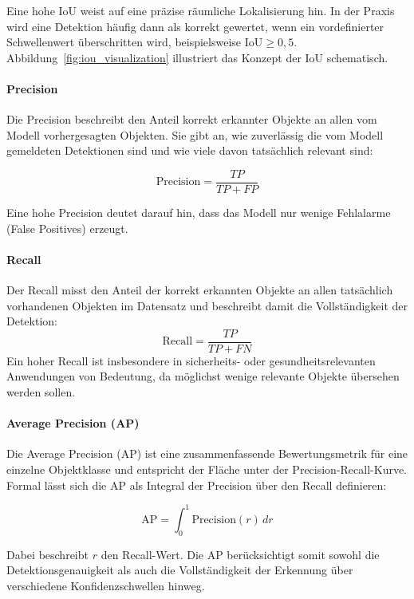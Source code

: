 Eine hohe IoU weist auf eine präzise räumliche Lokalisierung hin. In der Praxis 
wird eine Detektion häufig dann als korrekt gewertet, wenn ein vordefinierter
Schwellenwert überschritten wird, beispielsweise $\text{IoU} \geq 0{,}5$.
Abbildung~\ref{fig:iou_visualization} illustriert das Konzept der IoU
schematisch.

\paragraph{Precision}
Die Precision beschreibt den Anteil korrekt erkannter Objekte an allen vom Modell
vorhergesagten Objekten. Sie gibt an, wie zuverlässig die vom Modell gemeldeten
Detektionen sind und wie viele davon tatsächlich relevant sind:

\begin{equation}
\text{Precision} = \frac{TP}{TP + FP}
\end{equation}

Eine hohe Precision deutet darauf hin, dass das Modell nur wenige Fehlalarme
(False Positives) erzeugt.

\paragraph{Recall}
Der Recall misst den Anteil der korrekt erkannten Objekte an allen tatsächlich
vorhandenen Objekten im Datensatz und beschreibt damit die Vollständigkeit der
Detektion:
\begin{equation}
\text{Recall} = \frac{TP}{TP + FN}
\end{equation}
Ein hoher Recall ist insbesondere in sicherheits- oder gesundheitsrelevanten
Anwendungen von Bedeutung, da möglichst wenige relevante Objekte übersehen werden
sollen.

\paragraph{Average Precision (AP)}
Die Average Precision (AP) ist eine zusammenfassende Bewertungsmetrik für eine
einzelne Objektklasse und entspricht der Fläche unter der Precision-Recall-Kurve.
Formal lässt sich die AP als Integral der Precision über den Recall definieren:

\begin{equation}
\text{AP} = \int_{0}^{1} \text{Precision}(r)\, dr
\end{equation}

Dabei beschreibt $r$ den Recall-Wert. Die AP berücksichtigt somit sowohl die
Detektionsgenauigkeit als auch die Vollständigkeit der Erkennung über verschiedene
Konfidenzschwellen hinweg.

